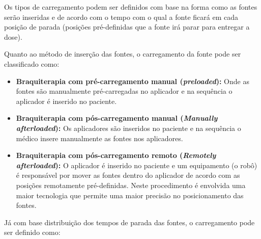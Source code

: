 \documentclass[11pt,a4paper]{article}
\begin{document}
			Os tipos de carregamento podem ser definidos com base na forma como as fontes serão inseridas e de acordo com o tempo com o qual a fonte ficará em cada posição de parada (posições pré-definidas que a fonte irá parar para entregar a dose).

			Quanto ao método de inserção das fontes, o carregamento da fonte pode ser classificado como:

			\begin{itemize}
				\item \textbf{Braquiterapia com pré-carregamento manual (\textit{preloaded}):} Onde as fontes são manualmente pré-carregadas no aplicador e na sequência o aplicador é inserido no paciente.
				\item \textbf{Braquiterapia com pós-carregamento manual (\textit{Manually afterloaded}):} Os aplicadores são inseridos no paciente e na sequência o médico insere manualmente as fontes nos aplicadores.
				\item \textbf{Braquiterapia com pós-carregamento remoto (\textit{Remotely afterloaded}):} O aplicador é inserido no paciente e um equipamento (o robô) é responsável por mover as fontes dentro do aplicador de acordo com as posições remotamente pré-definidas. Neste procedimento é envolvida uma maior tecnologia que permite uma maior precisão no posicionamento das fontes.
			\end{itemize}

			Já com base distribuição dos tempos de parada das fontes, o carregamento pode ser definido como:
\end{document}
